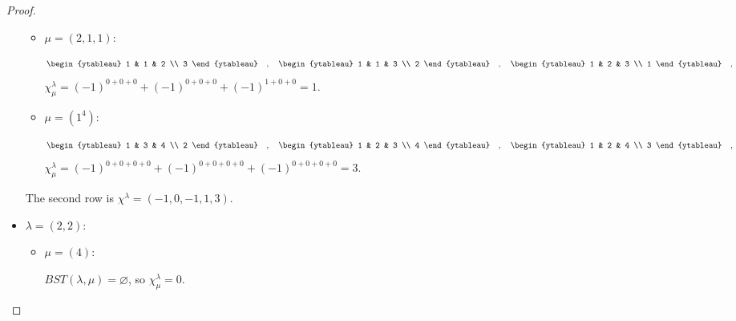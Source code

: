 \documentclass[8pt]{extarticle}
\newcommand{\<}{\langle}
\renewcommand{\>}{\rangle}
\renewcommand{\emptyset}{\varnothing}
\theoremstyle{definition}
\begin{document}
\begin{proof}
\begin{itemize}
\begin{itemize}
    \item
      $\mu = (2,1,1)$:
      
      \begin{align*}
        \begin{ytableau}
          1 & 1 & 2 \\
          3
        \end{ytableau}\quad,\quad
        \begin{ytableau}
          1 & 1 & 3 \\
          2
        \end{ytableau}\quad,\quad
        \begin{ytableau}
          1 & 2 & 3 \\
          1
        \end{ytableau}\quad,                
      \end{align*}
      $\chi_{\mu}^{\lambda}  = (-1)^{0+0+0} + (-1)^{0+0+0} + (-1)^{1+0+0}= 1$.

    \item
      $\mu = (1^4)$:
      
      \begin{align*}
        \begin{ytableau}
          1 & 3 & 4 \\
          2
        \end{ytableau}\quad,\quad
        \begin{ytableau}
          1 & 2 & 3 \\
          4
        \end{ytableau}\quad,\quad
        \begin{ytableau}
          1 & 2 & 4 \\
          3
        \end{ytableau}\quad,                
      \end{align*}
      $\chi_{\mu}^{\lambda}  = (-1)^{0+0+0+0} + (-1)^{0+0+0+0} +(-1)^{0+0+0+0} = 3$.

    \end{itemize}
    The second row is $\chi^{\lambda} = (-1,0,-1,1,3). $    

  \item
    $\lambda = (2,2)$:
    
    \begin{itemize}
      
    \item
      $\mu = (4)$:
      
      $BST(\lambda,\mu) = \emptyset$, so $\chi_{\mu}^{\lambda} = 0$.


\end{itemize}
\end{itemize}
\end{proof}
\end{document}
